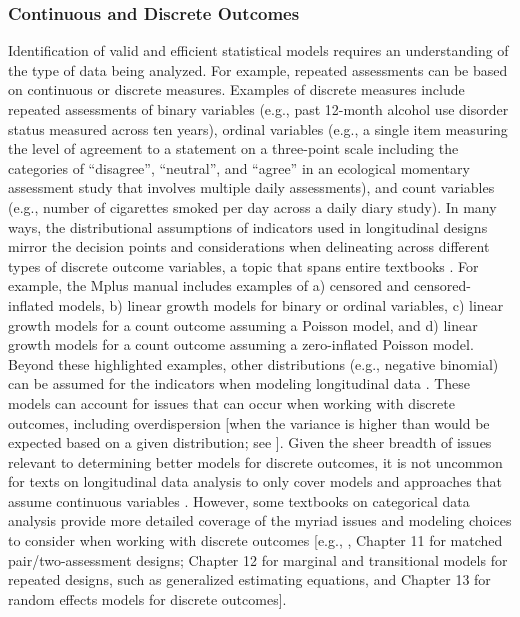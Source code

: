 \documentclass[
  number,
  preprint,
  3p,
  twocolumn]{elsarticle}
\begin{document}
\hypertarget{continuous-and-discrete-outcomes}{%
\subsubsection{Continuous and Discrete
Outcomes}\label{continuous-and-discrete-outcomes}}

Identification of valid and efficient statistical models requires an
understanding of the type of data being analyzed. For example, repeated
assessments can be based on continuous or discrete measures. Examples of
discrete measures include repeated assessments of binary variables
(e.g., past 12-month alcohol use disorder status measured across ten
years), ordinal variables (e.g., a single item measuring the level of
agreement to a statement on a three-point scale including the categories
of ``disagree'', ``neutral'', and ``agree'' in an ecological momentary
assessment study that involves multiple daily assessments), and count
variables (e.g., number of cigarettes smoked per day across a daily
diary study). In many ways, the distributional assumptions of indicators
used in longitudinal designs mirror the decision points and
considerations when delineating across different types of discrete
outcome variables, a topic that spans entire textbooks \citep[e.g.,
see][]{lenz2016}. For example, the Mplus manual \citep{muthen2017}
includes examples of a) censored and censored-inflated models, b) linear
growth models for binary or ordinal variables, c) linear growth models
for a count outcome assuming a Poisson model, and d) linear growth
models for a count outcome assuming a zero-inflated Poisson model.
Beyond these highlighted examples, other distributions (e.g., negative
binomial) can be assumed for the indicators when modeling longitudinal
data \citep{ren2022}. These models can account for issues that can occur
when working with discrete outcomes, including overdispersion {[}when
the variance is higher than would be expected based on a given
distribution; see \citep{lenz2016}{]}. Given the sheer breadth of issues
relevant to determining better models for discrete outcomes, it is not
uncommon for texts on longitudinal data analysis to only cover models
and approaches that assume continuous variables
\citep[e.g.,][]{little2013}. However, some textbooks on categorical data
analysis provide more detailed coverage of the myriad issues and
modeling choices to consider when working with discrete outcomes
{[}e.g., \citep{lenz2016}, Chapter 11 for matched pair/two-assessment
designs; Chapter 12 for marginal and transitional models for repeated
designs, such as generalized estimating equations, and Chapter 13 for
random effects models for discrete outcomes{]}.
\end{document}
